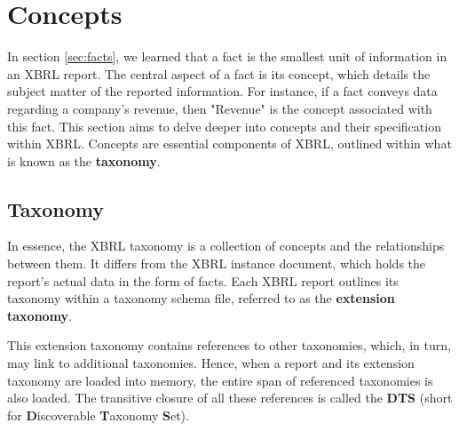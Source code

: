 \section{Concepts}
\label{sec:concepts}

In section \ref{sec:facts}, we learned that a fact is the smallest unit of information in an XBRL report. 
The central aspect of a fact is its concept,
which details the subject matter of the reported information.
For instance, if a fact conveys data regarding a company's revenue, then "Revenue" is the concept associated with this fact.
This section aims to delve deeper into concepts and their specification within XBRL.
Concepts are essential components of XBRL, outlined within what is known as the \textbf{taxonomy}.

\subsection{Taxonomy}

In essence, the XBRL taxonomy is a collection of concepts and the relationships between them.
It differs from the XBRL instance document, which holds the report's actual data in the form of facts.
Each XBRL report outlines its taxonomy within a taxonomy schema file,
referred to as the \textbf{extension taxonomy}.

This extension taxonomy contains references to other taxonomies, which, in turn, may link to additional taxonomies.
Hence, when a report and its extension taxonomy are loaded into memory, the entire span of referenced taxonomies is also loaded.
The transitive closure of all these references is called the \textbf{DTS} (short for \textbf{D}iscoverable \textbf{T}axonomy \textbf{S}et).


